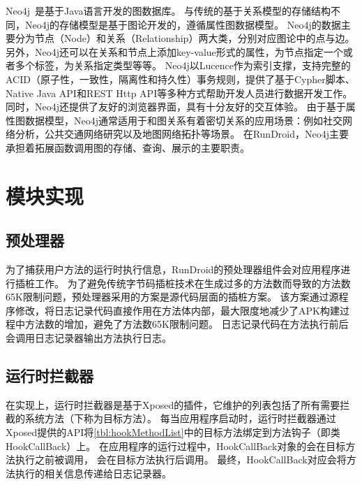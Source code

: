 Neo4j~\cite{Neo4jthe19}是基于Java语言开发的图数据库。
与传统的基于关系模型的存储结构不同，Neo4j的存储模型是基于图论开发的，遵循属性图数据模型。
Neo4j的数据主要分为节点（Node）和关系（Relationship）两大类，分别对应图论中的点与边。
另外，Neo4j还可以在关系和节点上添加key-value形式的属性，为节点指定一个或者多个标签，为关系指定类型等等。
Neo4j以Lucence作为索引支撑，支持完整的 ACID（原子性，一致性，隔离性和持久性）事务规则，提供了基于Cypher脚本、Native Java API和REST Http API等多种方式帮助开发人员进行数据开发工作。
同时，Neo4j还提供了友好的浏览器界面，具有十分友好的交互体验。
由于基于属性图数据模型，Neo4j通常适用于和图关系有着密切关系的应用场景：例如社交网络分析，公共交通网络研究以及地图网络拓扑等场景。
在RunDroid，Neo4j主要承担着拓展函数调用图的存储、查询、展示的主要职责。


\section{模块实现}



\subsection{预处理器}

为了捕获用户方法的运行时执行信息，RunDroid的预处理器组件会对应用程序进行插桩工作。
为了避免传统字节码插桩技术在生成过多的方法数而导致的方法数65K限制问题，预处理器采用的方案是源代码层面的插桩方案。
该方案通过源程序修改，将日志记录代码直接作用在方法体内部，最大限度地减少了APK构建过程中方法数的增加，避免了方法数65K限制问题。
日志记录代码在方法执行前后会调用日志记录器输出方法执行日志。





\subsection{运行时拦截器}


在实现上，运行时拦截器是基于Xposed的插件，它维护的列表包括了所有需要拦截的系统方法（下称为目标方法）。%
每当应用程序启动时，运行时拦截器通过Xposed提供的API将\autoref{tbl:hookMethodList}中的目标方法绑定到方法钩子（即类HookCallBack）上。
在应用程序的运行过程中，HookCallBack对象的会在目标方法执行之前被调用，
会在目标方法执行后调用。
最终，HookCallBack对应会将方法执行的相关信息传递给日志记录器。



